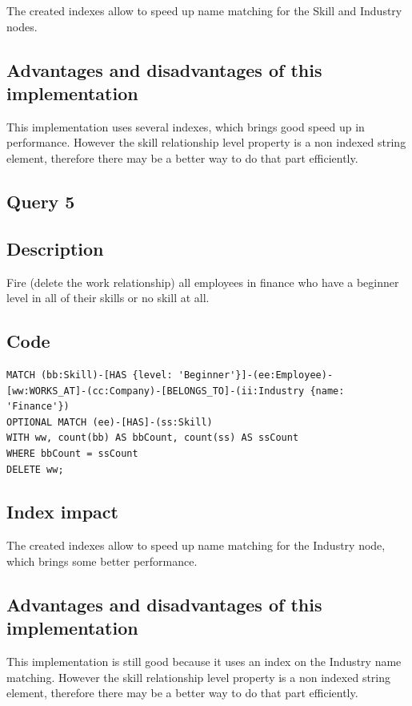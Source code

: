 \documentclass[a4paper, 11pt, titlepage]{article}
\begin{document}
\noindent
The created indexes allow to speed up name matching for the Skill and Industry nodes.


\subsection* {Advantages and disadvantages of this implementation}

\noindent
This implementation uses several indexes, which brings good speed up in performance. However the skill relationship level property is a non indexed string element, therefore there may be a better way to do that part efficiently.



\subsection {Query 5}

\subsection* {Description}

\noindent
Fire (delete the work relationship) all employees in finance who have a beginner level in all of their skills or no skill at all.


\subsection* {Code}

\begin{verbatim}
MATCH (bb:Skill)-[HAS {level: 'Beginner'}]-(ee:Employee)-
[ww:WORKS_AT]-(cc:Company)-[BELONGS_TO]-(ii:Industry {name: 'Finance'})
OPTIONAL MATCH (ee)-[HAS]-(ss:Skill)
WITH ww, count(bb) AS bbCount, count(ss) AS ssCount
WHERE bbCount = ssCount
DELETE ww;
\end{verbatim}


\subsection* {Index impact}

\noindent
The created indexes allow to speed up name matching for the Industry node, which brings some better performance.


\subsection* {Advantages and disadvantages of this implementation}

\noindent
This implementation is still good because it uses an index on the Industry name matching. However the skill relationship level property is a non indexed string element, therefore there may be a better way to do that part efficiently.
\end{document}
